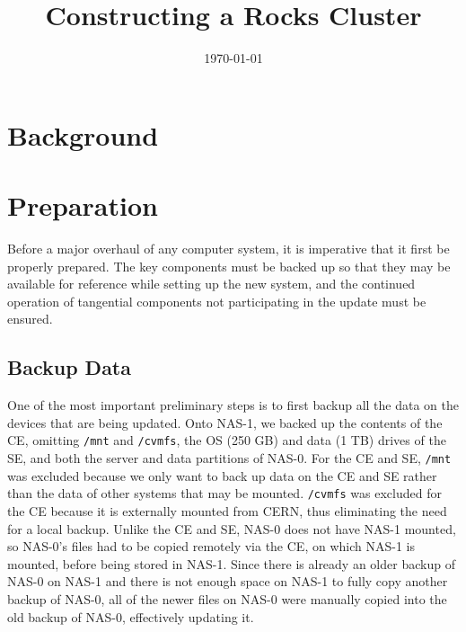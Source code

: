 \documentclass[12pt]{article}
\begin{document}

\title{Constructing a Rocks Cluster}

\date{\today}

\thispagestyle{empty}

\maketitle

\newpage



\tableofcontents

\newpage



\section{Background}

\qq 




\section{Preparation}

\qq Before a major overhaul of any computer system, it is imperative that it
first be properly prepared. The key components must be backed up so that they
may be available for reference while setting up the new system, and the
continued operation of tangential components not participating in the update
must be ensured.

\subsection{Backup Data}

\qq One of the most important preliminary steps is to first backup all the data
on the devices that are being updated. Onto NAS-1, we backed up the contents of
the CE, omitting {\tt /mnt} and {\tt /cvmfs}, the OS (250 GB) and data (1 TB)
drives of the SE, and both the server and data partitions of NAS-0. For the CE
and SE, {\tt /mnt} was excluded because we only want to back up data on the CE
and SE rather than the data of other systems that may be mounted. {\tt /cvmfs}
was excluded for the CE because it is externally mounted from CERN, thus
eliminating the need for a local backup. Unlike the CE and SE, NAS-0 does not
have NAS-1 mounted, so NAS-0's files had to be copied remotely via the CE, on
which NAS-1 is mounted, before being stored in NAS-1. Since there is already an
older backup of NAS-0 on NAS-1 and there is not enough space on NAS-1 to fully
copy another backup of NAS-0, all of the newer files on NAS-0 were manually
copied into the old backup of NAS-0, effectively updating it.
\end{document}
